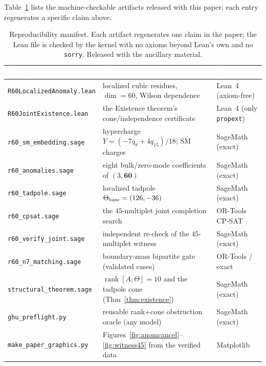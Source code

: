 \documentclass[11pt,a4paper]{article}
\begin{document}
Table~\ref{tab:artifacts} lists the machine-checkable artifacts released with this
paper; each entry regenerates a specific claim above.

\begin{table}[h]
\centering
\footnotesize
{}
\begin{tabular}{lll}
\toprule
\rowcolor{hdrblue}
\textcolor{white}{Artifact} & \textcolor{white}{Certifies} & \textcolor{white}{Tool}\\
\midrule
\texttt{R60LocalizedAnomaly.lean} & localized cubic residues, $\dim=60$, Wilson dependence & Lean~4 (axiom-free)\\
\texttt{R60JointExistence.lean}   & the Existence theorem's cone/independence certificate & Lean~4 (only \texttt{propext})\\
\texttt{r60\_sm\_embedding.sage}   & hypercharge $Y=(-7q_8+4q_{15})/18$; SM charges & SageMath (exact)\\
\texttt{r60\_anomalies.sage}       & eight bulk/zero-mode coefficients of $(3,\mathbf{60})$ & SageMath (exact)\\
\texttt{r60\_tadpole.sage}         & localized tadpole $\Theta_{\rm base}=(126,-36)$ & SageMath (exact)\\
\texttt{r60\_cpsat.sage}           & the $45$-multiplet joint completion search & OR-Tools CP-SAT\\
\texttt{r60\_verify\_joint.sage}   & independent re-check of the $45$-multiplet witness & SageMath (exact)\\
\texttt{r60\_n7\_matching.sage}    & boundary-mass bipartite gate (validated cases) & OR-Tools / exact\\
\texttt{structural\_theorem.sage} & $\operatorname{rank}[A;\Theta]=10$ and the tadpole cone (Thm~\ref{thm:existence}) & SageMath (exact)\\
\texttt{ghu\_preflight.py}        & reusable rank$+$cone obstruction oracle (any model) & SageMath (exact)\\
\texttt{make\_paper\_graphics.py}  & Figures~\ref{fig:anomcancel}--\ref{fig:witness45} from the verified data & Matplotlib\\
\bottomrule
\end{tabular}
\caption{Reproducibility manifest. Each artifact regenerates one claim in the paper; the
Lean file is checked by the kernel with no axioms beyond Lean's own and no \texttt{sorry}.
Released with the ancillary material.}
\label{tab:artifacts}
\end{table}
\end{document}
